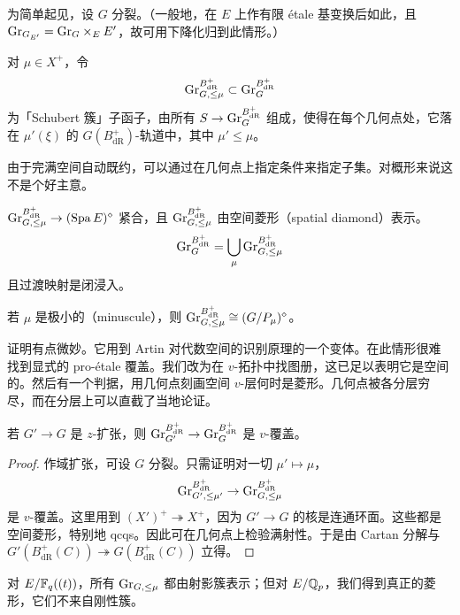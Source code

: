 为简单起见，设 $G$ 分裂。（一般地，在 $E$ 上作有限 étale 基变换后如此，且 $\mathrm{Gr}_{G_{E'}}=\mathrm{Gr}_G\times_E E'$，故可用下降化归到此情形。）


\begin{definition}
对 $\mu\in X^{+}$，令
\[
\mathrm{Gr}^{B^+_{\mathrm{dR}}}_{G,\le\mu}\subset\mathrm{Gr}^{B^+_{\mathrm{dR}}}_G
\]
为「Schubert 簇」子函子，由所有 $S\to\mathrm{Gr}^{B^+_{\mathrm{dR}}}_G$ 组成，使得在每个几何点处，它落在 $\mu'(\xi)$ 的 $G(B^+_{\mathrm{dR}})$-轨道中，其中 $\mu'\le\mu$。
\end{definition}

\begin{remark}
由于完满空间自动既约，可以通过在几何点上指定条件来指定子集。对概形来说这不是个好主意。
\end{remark}

\begin{theorem}
$\mathrm{Gr}^{B^+_{\mathrm{dR}}}_{G,\le\mu}\to(\operatorname{Spa} E)^{\diamond}$ 紧合，且 $\mathrm{Gr}^{B^+_{\mathrm{dR}}}_{G,\le\mu}$ 由空间菱形（spatial diamond）表示。
\[
\mathrm{Gr}^{B^+_{\mathrm{dR}}}_G=\bigcup_{\mu}\mathrm{Gr}^{B^+_{\mathrm{dR}}}_{G,\le\mu}
\]
且过渡映射是闭浸入。

若 $\mu$ 是极小的（minuscule），则 $\mathrm{Gr}^{B^+_{\mathrm{dR}}}_{G,\le\mu}\cong(G/P_\mu)^{\diamond}$。
\end{theorem}

证明有点微妙。它用到 Artin 对代数空间的识别原理的一个变体。在此情形很难找到显式的 pro-étale 覆盖。我们改为在 $v$-拓扑中找图册，这已足以表明它是空间的。然后有一个判据，用几何点刻画空间 $v$-层何时是菱形。几何点被各分层穷尽，而在分层上可以直截了当地论证。

\begin{corollary}
若 $G'\to G$ 是 $z$-扩张，则 $\mathrm{Gr}^{B^+_{\mathrm{dR}}}_{G'}\to\mathrm{Gr}^{B^+_{\mathrm{dR}}}_G$ 是 $v$-覆盖。
\end{corollary}

\begin{proof}
作域扩张，可设 $G$ 分裂。只需证明对一切 $\mu'\mapsto\mu$，
\[
\mathrm{Gr}^{B^+_{\mathrm{dR}}}_{G',\le\mu'}\to\mathrm{Gr}^{B^+_{\mathrm{dR}}}_{G,\le\mu}
\]
是 $v$-覆盖。这里用到 $(X')^{+}\twoheadrightarrow X^{+}$，因为 $G'\to G$ 的核是连通环面。这些都是空间菱形，特别地 qcqs。因此可在几何点上检验满射性。于是由 Cartan 分解与 $G'(B^+_{\mathrm{dR}}(C))\twoheadrightarrow G(B^+_{\mathrm{dR}}(C))$ 立得。
\end{proof}

\begin{remark}
对 $E/\mathbb{F}_q((t))$，所有 $\mathrm{Gr}_{G,\le\mu}$ 都由射影簇表示；但对 $E/\mathbb{Q}_p$，我们得到真正的菱形，它们不来自刚性簇。
\end{remark}

